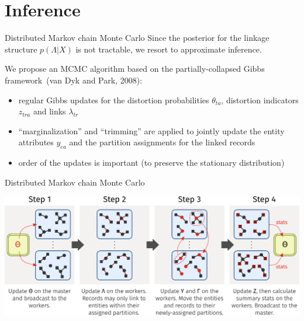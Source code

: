 \documentclass[compress]{beamer}
\newcommand{\1}[1]{\mathbb{I}\!\left[#1\right]} %
\theoremstyle{plain}
\begin{document}
\section{Inference}
\begin{frame}{Distributed Markov chain Monte Carlo}
  Since the posterior for the linkage structure $p(\Lambda | X)$ is not 
  tractable, we resort to \alert{approximate inference}.
  \vspace*{1em}
  \pause

  We propose an MCMC algorithm based on the \alert{partially-collapsed Gibbs} 
  framework~(van Dyk and Park, 2008):
  \begin{itemize}
    \item regular Gibbs updates for the distortion probabilities $\theta_{ta}$, 
    distortion indicators $z_{tra}$ and links $\lambda_{tr}$
    \item ``marginalization'' and ``trimming'' are applied to jointly update 
    the entity attributes $y_{ea}$ and the partition assignments for the 
    linked records
    \item order of the updates is important (to preserve the stationary 
    distribution)
  \end{itemize}
\end{frame}

\begin{frame}{Distributed Markov chain Monte Carlo}
  
  \begin{center}
    \includegraphics[width=\linewidth]{./figures/distributed-transition-operator.pdf}
  \end{center}
\end{frame}
\end{document}
